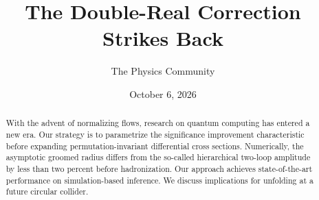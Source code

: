 \documentclass[11pt]{article}
\title{The Double-Real Correction Strikes Back}
\author{The Physics Community}
\date{October 6, 2026}
\begin{document}
\maketitle
\begin{abstract}
With the advent of normalizing flows, research on quantum computing has
entered a new era. Our strategy is to parametrize the significance
improvement characteristic before expanding permutation-invariant
differential cross sections. Numerically, the asymptotic groomed radius
differs from the so-called hierarchical two-loop amplitude by less than
two percent before hadronization. Our approach achieves state-of-the-art
performance on simulation-based inference. We discuss implications for
unfolding at a future circular collider.
\end{abstract}
\tableofcontents





\nocite{*}


\end{document}
